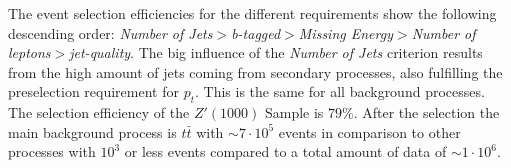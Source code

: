 The event selection efficiencies for the different requirements show the following descending order: 
\emph{Number of Jets}$>$\emph{b-tagged}$>$\emph{Missing Energy}$>$\emph{Number of leptons}$>$\emph{jet-quality}. 
The big influence of the \emph{Number of Jets} criterion results from the high amount of jets coming from secondary processes, also fulfilling the 
preselection requirement for $p_t$. This is the same for all background processes. The selection efficiency of the $Z'(1000)$ Sample is $79\%$. 
After the selection the main background process is $t\bar t$ with $\sim 7\cdot 10^5$ events in comparison to other processes with $10^3$ or less events
compared to a total amount of data of $\sim 1\cdot 10^6$.
	

